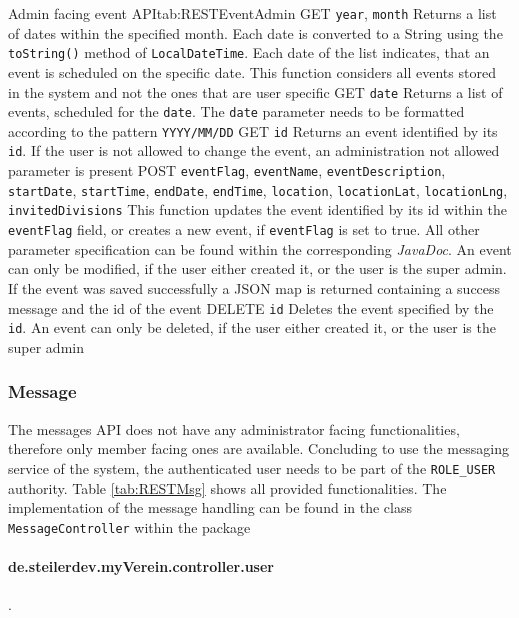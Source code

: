 \begin{RESTTable}{Admin facing event API}{tab:RESTEventAdmin}
		{GET}
		{\texttt{year}, \texttt{month}}
		{Returns a list of dates within the specified month. Each date is converted to a String using the \texttt{toString()} method of \texttt{LocalDateTime}. Each date of the list indicates, that an event is scheduled on the specific date. This function considers all events stored in the system and not the ones that are user specific}
		{GET}
		{\texttt{date}}
		{Returns a list of events, scheduled for the \texttt{date}. The \texttt{date} parameter needs to be formatted according to the pattern \texttt{YYYY/MM/DD}}
		{GET}
		{\texttt{id}}
		{Returns an event identified by its \texttt{id}. If the user is not allowed to change the event, an administration not allowed parameter is present}
		{POST}
		{\texttt{eventFlag}, \texttt{eventName}, \texttt{eventDescription}, \texttt{startDate}, \texttt{startTime}, \texttt{endDate}, \texttt{endTime}, \texttt{location}, \texttt{locationLat}, \texttt{locationLng}, \texttt{invitedDivisions}}
		{This function updates the event identified by its id within the \texttt{eventFlag} field, or creates a new event, if \texttt{eventFlag} is set to true. All other parameter specification can be found within the corresponding \emph{JavaDoc}. An event can only be modified, if the user either created it, or the user is the super admin. If the event was saved successfully a JSON map is returned containing a success message and the id of the event}
		{DELETE}
		{\texttt{id}}
		{Deletes the event specified by the \texttt{id}. An event can only be deleted, if the user either created it, or the user is the super admin}	
\end{RESTTable}

\subsubsection{Message}

The messages \gls{API} does not have any administrator facing functionalities, therefore only member facing ones are available. Concluding to use the messaging service of the system, the authenticated user needs to be part of the \texttt{ROLE\_USER} authority. Table \vref{tab:RESTMsg} shows all provided functionalities. The implementation of the message handling can be found in the class \texttt{MessageController} within the package \paragraph{de.steilerdev.myVerein.controller.user}.

